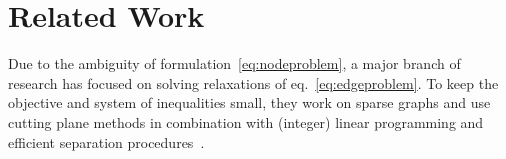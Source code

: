 \documentclass[10pt,twocolumn,letterpaper]{article}
\DeclareMathOperator*{\argmin}{arg\,min}
\begin{document}





\section{Related Work}\label{sec:related_work}%
%
Due to the ambiguity of formulation~\ref{eq:nodeproblem},
a major branch of research has focused on solving 
relaxations of eq.~\ref{eq:edgeproblem}.
To keep the objective and system of inequalities small, they 
work on sparse graphs and
use cutting plane methods
in combination with (integer) linear programming and efficient 
separation procedures~\cite{kappes_2011_emmcvpr,andres_2011_iccv,kappes_2013_arxiv}.
\end{document}
